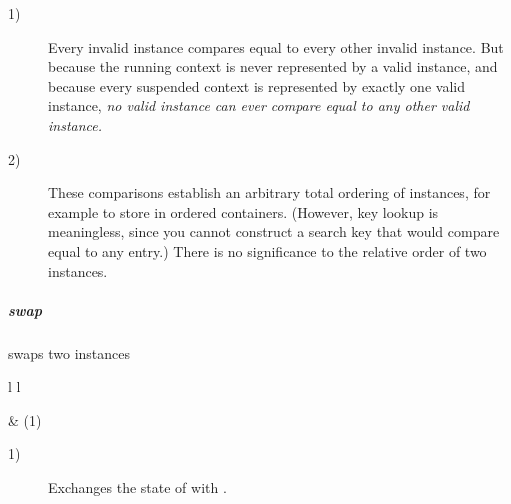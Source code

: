 \begin{description}
    \item[1)] Every invalid \ectx instance compares equal to every other
              invalid instance. But because the running context is never
              represented by a valid \ectx instance, and because every
              suspended context is represented by exactly one valid
              instance, \emph{no valid instance can ever compare equal to any
              other valid instance.}
    \item[2)] These comparisons establish an arbitrary total ordering of \ectx
              instances, for example to store in ordered containers. (However,
              key lookup is meaningless, since you cannot construct a search
              key that would compare equal to any entry.) There is no
              significance to the relative order of two instances.
\end{description}

\subparagraph*{swap}
swaps two \ectx instances\\

\begin{tabular}{ l l }
    \midrule

     & (1)\\

    \midrule
\end{tabular}

\begin{description}
    \item[1)] Exchanges the state of  with .
\end{description}
